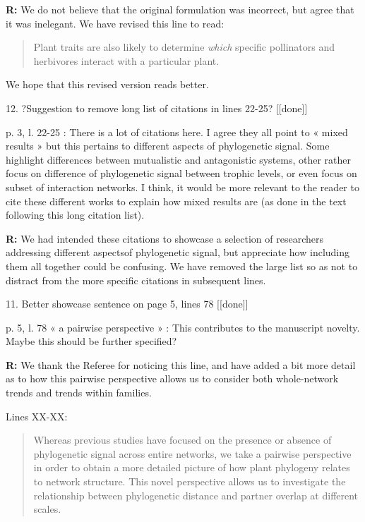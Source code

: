 \documentclass[12pt]{letter}
\newenvironment{refquote}{\bigskip \begin{it}}{\end{it}\smallskip}
\begin{document}
	\textbf{R:} We do not believe that the original formulation was incorrect, but agree that it was inelegant. We have revised this line to read:
	\begin{quotation}
		Plant traits are also likely to determine \emph{which} specific pollinators and herbivores interact with a particular plant.
  	\end{quotation}
  	We hope that this revised version reads better.


12. ?Suggestion to remove long list of citations in lines 22-25? [[done]]

	\begin{refquote}
		p. 3, l. 22-25 : There is a lot of citations here. I agree they all point to « mixed results » but this pertains to different aspects of phylogenetic signal. Some highlight differences between mutualistic and antagonistic systems, other rather focus on difference of phylogenetic signal between trophic levels, or even focus on subset of interaction networks. I think, it would be more relevant to the reader to cite these different works to explain how mixed results are (as done in the text following this long citation list).
	\end{refquote}


	\textbf{R:} We had intended these citations to showcase a selection of researchers addressing different aspectsof phylogenetic signal, but appreciate how including them all together could be confusing. We have removed the large list so as not to distract from the more specific citations in subsequent lines.


11. Better showcase sentence on page 5, lines 78 [[done]]

	\begin{refquote}
		p. 5, l. 78 « a pairwise perspective » : This contributes to the manuscript novelty. Maybe this should be further specified?
	\end{refquote}

	\textbf{R:} We thank the Referee for noticing this line, and have added a bit more detail as to how this pairwise perspective allows us to consider both whole-network trends and trends within families.


	Lines XX-XX:

	\begin{quotation}

		Whereas previous 
	  studies have focused on the presence or absence of phylogenetic
	  signal across entire networks, we take a pairwise perspective in
	  order to obtain a more detailed picture of how plant phylogeny
	  relates to network structure. This novel perspective allows us to investigate the relationship between phylogenetic distance and partner overlap at different scales. 

	\end{quotation}
\end{document}
